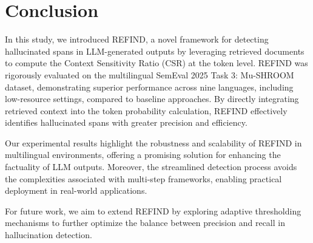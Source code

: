 \section{Conclusion}
In this study, we introduced REFIND, a novel framework for detecting hallucinated spans in LLM-generated outputs by leveraging retrieved documents to compute the Context Sensitivity Ratio (CSR) at the token level. REFIND was rigorously evaluated on the multilingual SemEval 2025 Task 3: Mu-SHROOM dataset, demonstrating superior performance across nine languages, including low-resource settings, compared to baseline approaches. By directly integrating retrieved context into the token probability calculation, REFIND effectively identifies hallucinated spans with greater precision and efficiency.

Our experimental results highlight the robustness and scalability of REFIND in multilingual environments, offering a promising solution for enhancing the factuality of LLM outputs. Moreover, the streamlined detection process avoids the complexities associated with multi-step frameworks, enabling practical deployment in real-world applications.

For future work, we aim to extend REFIND by exploring adaptive thresholding mechanisms to further optimize the balance between precision and recall in hallucination detection. 
